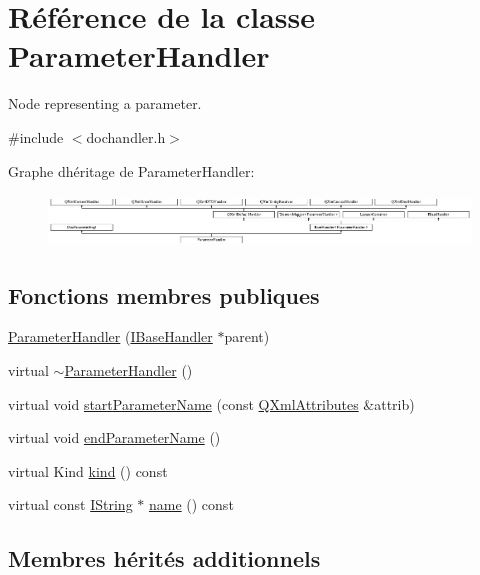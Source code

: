 \hypertarget{class_parameter_handler}{}\section{Référence de la classe Parameter\+Handler}
\label{class_parameter_handler}


Node representing a parameter.  




{\ttfamily \#include $<$dochandler.\+h$>$}

Graphe d\textquotesingle{}héritage de Parameter\+Handler\+:\begin{figure}[H]
\begin{center}
\leavevmode
\includegraphics[height=1.361702cm]{class_parameter_handler}
\end{center}
\end{figure}
\subsection*{Fonctions membres publiques}
\begin{DoxyCompactItemize}
\item 
\hyperlink{class_parameter_handler_a8c5fb5c7f305fab93a3479dd42d769e7}{Parameter\+Handler} (\hyperlink{class_i_base_handler}{I\+Base\+Handler} $\ast$parent)
\item 
virtual \hyperlink{class_parameter_handler_afb238df795f2c2a788048a688f468fcf}{$\sim$\+Parameter\+Handler} ()
\item 
virtual void \hyperlink{class_parameter_handler_a04da6a3e432894b73eeba62424c082c3}{start\+Parameter\+Name} (const \hyperlink{class_q_xml_attributes}{Q\+Xml\+Attributes} \&attrib)
\item 
virtual void \hyperlink{class_parameter_handler_a89c1ea9adb2f18b0902045deb8aa0637}{end\+Parameter\+Name} ()
\item 
virtual Kind \hyperlink{class_parameter_handler_a0c92d66b8ebd16ea278c4d318a64f7dd}{kind} () const 
\item 
virtual const \hyperlink{class_i_string}{I\+String} $\ast$ \hyperlink{class_parameter_handler_a18a518f4ff92eddfa74acc0c46f18096}{name} () const 
\end{DoxyCompactItemize}
\subsection*{Membres hérités additionnels}


